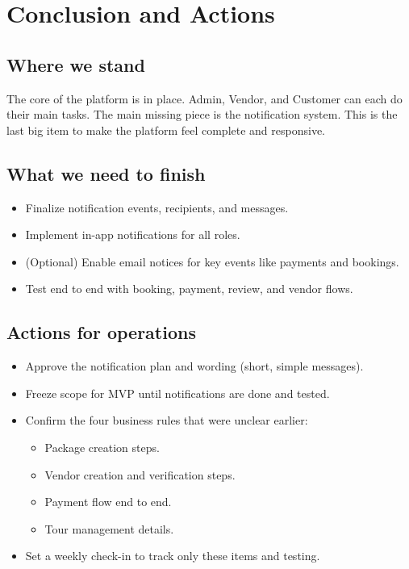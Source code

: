 \chapter{Conclusion and Actions}

\section{Where we stand}
The core of the platform is in place. Admin, Vendor, and Customer can each do their main tasks. The main missing piece is the notification system. This is the last big item to make the platform feel complete and responsive.

\section{What we need to finish}
\begin{itemize}
  \item Finalize notification events, recipients, and messages.
  \item Implement in-app notifications for all roles.
  \item (Optional) Enable email notices for key events like payments and bookings.
  \item Test end to end with booking, payment, review, and vendor flows.
\end{itemize}

\section{Actions for operations}
\begin{itemize}
  \item Approve the notification plan and wording (short, simple messages).
  \item Freeze scope for MVP until notifications are done and tested.
  \item Confirm the four business rules that were unclear earlier:
    \begin{itemize}
      \item Package creation steps.
      \item Vendor creation and verification steps.
      \item Payment flow end to end.
      \item Tour management details.
    \end{itemize}
  \item Set a weekly check-in to track only these items and testing.
\end{itemize}

